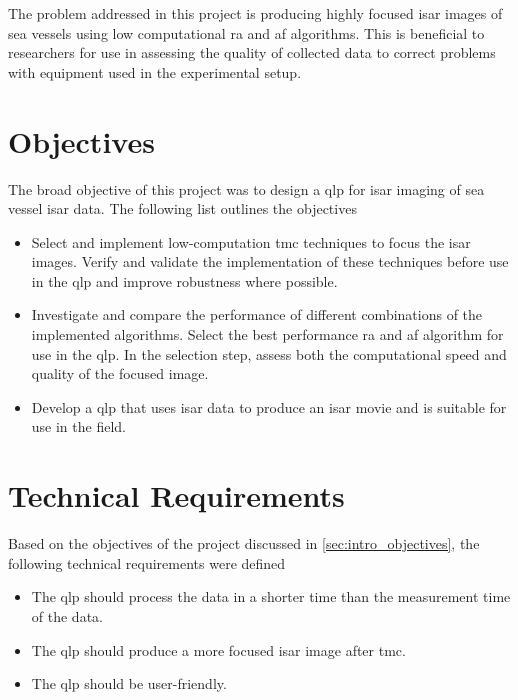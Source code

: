 \documentclass[class=report,11pt,crop=false]{standalone}
\begin{document}
The problem addressed in this project is producing highly focused \gls{isar} images of sea vessels using low computational \gls{ra} and \gls{af} algorithms. This is beneficial to researchers for use in assessing the quality of collected data  to correct problems with equipment used in the experimental setup.

\section{Objectives}\label{sec:intro_objectives}
The broad objective of this project was to design a \gls{qlp} for \gls{isar} imaging of sea vessel \gls{isar} data. The following list outlines the objectives
\begin{itemize}
    \item Select and implement low-computation \gls{tmc} techniques to focus the \gls{isar} images. Verify and validate the implementation of these techniques before use in the \gls{qlp} and improve robustness where possible.
    \item Investigate and compare the performance of different combinations of the implemented algorithms. Select the best performance \gls{ra} and \gls{af} algorithm for use in the \gls{qlp}. In the selection step, assess both the computational speed and quality of the focused image.
    \item Develop a \gls{qlp} that uses \gls{isar} data to produce an \gls{isar} movie and is suitable for use in the field.
\end{itemize}

\section{Technical Requirements}
Based on the objectives of the project discussed in \autoref{sec:intro_objectives}, the following technical requirements were defined
\begin{itemize}
    \item The \gls{qlp} should process the data in a shorter time than the measurement time of the data. 
    \item The \gls{qlp} should produce a more focused \gls{isar} image after \gls{tmc}.
    \item The \gls{qlp} should be user-friendly.
\end{itemize}
\end{document}
